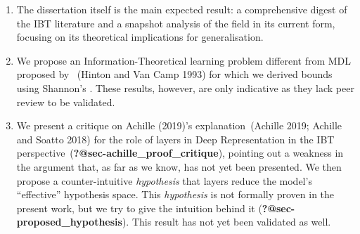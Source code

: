 \documentclass[
  letterpaper,
  12pt,
  british]{tufte-book}
\theoremstyle{plain}
\theoremstyle{definition}
\theoremstyle{plain}
\theoremstyle{remark}
\begin{document}
\begin{enumerate}
\def\labelenumi{\arabic{enumi}.}
\item
  The dissertation itself is the main expected result: a comprehensive
  digest of the {IBT} literature and a snapshot analysis of the field in
  its current form, focusing on its theoretical implications for
  generalisation.
\item
  We propose an Information-Theoretical learning problem different from
  {MDL} proposed by ~(Hinton and Van Camp
  1993)
  for which we derived bounds using Shannon's . These results, however,
  are only indicative as they lack peer review to be validated.
\item
  We present a critique on Achille
  (2019)'s
  explanation~(Achille 2019; Achille and Soatto
  2018)
  for the role of layers in Deep Representation in the {IBT}
  perspective~(\textbf{?@sec-achille\_proof\_critique}), pointing out a
  weakness in the argument that, as far as we know, has not yet been
  presented. We then propose a counter-intuitive \emph{hypothesis} that
  layers reduce the model's ``effective'' hypothesis space. This
  \emph{hypothesis} is not formally proven in the present work, but we
  try to give the intuition behind it
  (\textbf{?@sec-proposed\_hypothesis}). This result has not yet been
  validated as well.
\end{enumerate}
\end{document}
